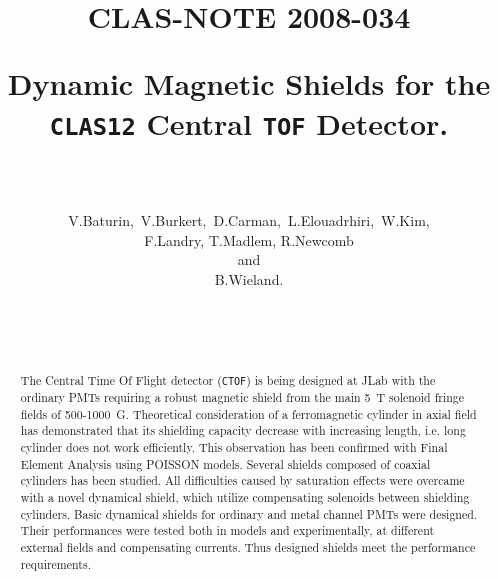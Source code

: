 \documentclass[12pt]{article}
\begin{document}
\pagestyle{plain}
%
%
%
%
\title
{
\vspace{-1.4cm}
\begin{flushright}
\normalsize{CLAS-NOTE 2008-034}
\bigskip 
\bigskip
\end{flushright}
\bigskip
Dynamic Magnetic Shields for the {\tt CLAS12} Central {\tt TOF} Detector.}
\author
{
{}\\
{}\\
\mbox
{V.Baturin, V.Burkert, D.Carman, L.Elouadrhiri, W.Kim,}\\
{ F.Landry, T.Madlem, R.Newcomb}\\
{and}\\
{B.Wieland.}
{}  \\
{}  \\
\mbox
{}\\
{}\\
}
\maketitle
\begin{abstract}
The Central Time Of Flight detector ({\tt CTOF}) 
is being designed at JLab with the  
ordinary  PMTs  requiring a robust magnetic shield from the  main
5~T solenoid fringe fields of 500-1000~G. 
Theoretical consideration of a  ferromagnetic cylinder in axial field  
has demonstrated  that its  shielding capacity  decrease  with  increasing length,
 i.e. long cylinder does not work efficiently. This observation
has been confirmed with Final Element Analysis using  POISSON models.
 Several shields  composed of  coaxial cylinders has been studied.
All  difficulties caused by  saturation effects  were overcame with 
a novel dynamical shield, which utilize  compensating solenoids between shielding cylinders.
Basic dynamical shields for ordinary  and metal channel PMTs were  
designed. Their performances were tested both in models and  experimentally, 
at different external fields and compensating currents. Thus designed  
shields meet the performance requirements.  
\end{abstract}
\newpage 
\tableofcontents
\newpage
\listoftables
\newpage
\listoffigures
\newpage
\end{document}
